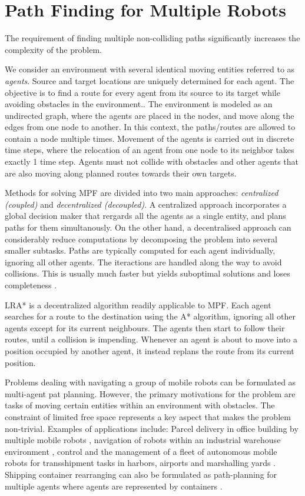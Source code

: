 \section{Path Finding for Multiple Robots}

The requirement of finding multiple non-colliding paths significantly increases the complexity of the problem.

We consider an environment with several identical moving entities referred to as \emph{agents}. 
Source and target locations are uniquely determined for each agent. 
The objective is to find a route for every agent from its source to its target while avoiding obstacles in the environment..
The environment is modeled as an undirected graph, where the agents are placed in the nodes, and move along the edges from one node to another. 
In this context, the paths/routes are allowed to contain a node multiple times.
Movement of the agents is carried out in discrete time steps, where the relocation of an agent from one node to its neighbor takes exactly 1 time step.
Agents must not collide with obstacles and other agents that are also moving along planned routes towards their own targets.

Methods for solving MPF are divided into two main approaches: \emph{centralized (coupled)} and \emph{decentralized (decoupled)}.
A centralized approach incorporates a global decision maker that rergards all the agents as a single entity, and plans paths for them simultanously.
On the other hand, a decentralised approach can considerably reduce computations by decomposing the problem into several smaller subtasks.
Paths are typically computed for each agent individually, ignoring all other agents.
The iteractions are handled along the way to avoid collisions.
This is usually much faster but yields suboptimal solutions and loses completeness \cite{ryan08}.

LRA* \cite{silver05} is a decentralized algorithm readily applicable to MPF.
Each  agent searches for a route to the destination using the A* algorithm, ignoring all other agents except for its current neighbours. 
The agents then start to follow their routes, until a collision is impending.  
Whenever an agent is about to move into a position occupied by another agent, it instead replans the route from its current position.

Problems dealing with navigating a group of mobile robots can be formulated as multi-agent pat planning.  
However, the primary motivations for the problem are tasks of moving certain entities within an environment with obstacles.
The constraint of limited free space represents a key aspect that makes the problem non-trivial. 
Examples of applications include: 
Parcel delivery in office building by multiple mobile robots \cite{hada01},
navigation of robots within an industrial warehouse environment \cite{everett95},
control and the management of a fleet of autonomous mobile robots for transshipment tasks in harbors, airports and marshalling yards \cite{alami98}.
Shipping container rearranging can also be formulated as path-planning for multiple agents where agents are represented by containers \cite{surynek11}.


